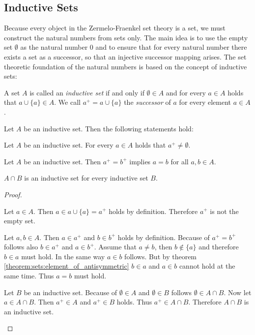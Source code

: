 \subsection{Inductive Sets}

Because every object in the Zermelo-Fraenkel set theory is a set, we must construct the natural numbers from sets only. The main idea is to use the empty set $\emptyset$ as the natural number $0$ and to ensure that for every natural number there exists a set as a successor, so that an injective successor mapping arises. The set theoretic foundation of the natural numbers is based on the concept of inductive sets:

\begin{definition}
    A set $A$ is called an \emph{inductive set} if and only if $\emptyset\in A$ and for every $a\in A$ holds that $a\cup\{a\}\in A$. We call $a^+=a\cup\{a\}$ the \emph{successor} of $a$ for every element $a\in A$.
\end{definition}

\begin{theorem}\label{theorem:sets:inductive_set_successor}
    Let $A$ be an inductive set. Then the following statements hold:
    \begin{intheoremenumerate}
        \item\label{theorem:natural_numbers:successor_welldefined} Let $A$ be an inductive set. For every $a\in A$ holds that $a^+\neq\emptyset$.
        
        \item\label{theorem:natural_numbers:successor_injective} Let $A$ be an inductive set. Then $a^+=b^+$ implies $a=b$ for all $a,b\in A$.
        
        \item\label{theorem:natural_numbers:intersection_inductive} $A\cap B$ is an inductive set for every inductive set $B$.
    \end{intheoremenumerate}
\end{theorem}

\begin{proof}
    \begin{proofenumerate}
        \item Let $a\in A$. Then $a\in a\cup\{a\}=a^+$ holds by definition. Therefore $a^+$ is not the empty set.
        
        \item Let $a,b\in A$. Then $a\in a^+$ and $b\in b^+$ holds by definition. Because of $a^+=b^+$ follows also $b\in a^+$ and $a\in b^+$. Assume that $a\neq b$, then $b\notin\{a\}$ and therefore $b\in a$ must hold. In the same way $a\in b$ follows. But by theorem \ref{theorem:sets:element_of_antisymmetric} $b\in a$ and $a\in b$ cannot hold at the same time. Thus $a=b$ must hold.
        
        \item Let $B$ be an inductive set. Because of $\emptyset\in A$ and $\emptyset\in B$ follows $\emptyset\in A\cap B$. Now let $a\in A\cap B$. Then $a^+\in A$ and $a^+\in B$ holds. Thus $a^+\in A\cap B$. Therefore $A\cap B$ is an inductive set.
    \end{proofenumerate}
\end{proof}

